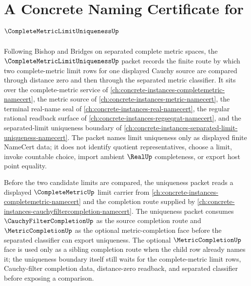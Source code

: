\chapter{A Concrete Naming Certificate for $\CompleteMetricLimitUniquenessUp$}
\label{ch:concrete-instances-complete-metric-limit-uniqueness-namecert}

Following Bishop and Bridges on separated complete metric spaces, the $\CompleteMetricLimitUniquenessUp$ packet records the finite route by which two complete-metric limit rows for one displayed Cauchy source are compared through distance zero and then through the separated metric classifier. It sits over the complete-metric service of \autoref{ch:concrete-instances-completemetric-namecert}, the metric source of \autoref{ch:concrete-instances-metric-namecert}, the terminal real-name seal of \autoref{ch:concrete-instances-real-namecert}, the regular rational readback surface of \autoref{ch:concrete-instances-regseqrat-namecert}, and the separated-limit uniqueness boundary of \autoref{ch:concrete-instances-separated-limit-uniqueness-namecert}. The packet names limit uniqueness only as displayed finite NameCert data; it does not identify quotient representatives, choose a limit, invoke countable choice, import ambient $\RealUp$ completeness, or export host point equality.

Before the two candidate limits are compared, the uniqueness packet reads a displayed $\CompleteMetricUp$ limit carrier from \autoref{ch:concrete-instances-completemetric-namecert} and the completion route supplied by \autoref{ch:concrete-instances-cauchyfiltercompletion-namecert}. The uniqueness packet consumes $\CauchyFilterCompletionUp$ as the source completion route and $\MetricCompletionUp$ as the optional metric-completion face before the separated classifier can export uniqueness. The optional $\MetricCompletionUp$ face is used only as a sibling completion route when the child row already names it; the uniqueness boundary itself still waits for the complete-metric limit rows, Cauchy-filter completion data, distance-zero readback, and separated classifier before exposing a comparison.

